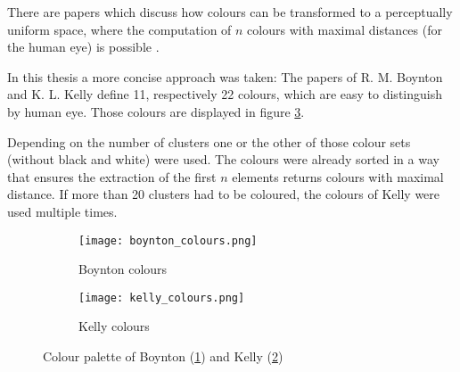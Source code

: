 There are papers which discuss how colours can be transformed to a perceptually uniform space, where the computation of $n$ colours with maximal distances (for the human eye) is possible \cite{colors:2006}.

In this thesis a more concise approach was taken: The papers of R. M. Boynton \cite{boynton:1989} and K. L. Kelly \cite{kelly:1965} define 11, respectively 22 colours, which are easy to distinguish by human eye. Those colours are displayed in figure \ref{fig:colours}.

Depending on the number of clusters one or the other of those colour sets (without black and white) were used. The colours were already sorted in a way that ensures the extraction of the first $n$ elements returns colours with maximal distance. If more than 20 clusters had to be coloured, the colours of Kelly were used multiple times.

\begin{figure}
    \centering
    \begin{subfigure}[b]{\textwidth}
        \begin{mdframed}[style=mdthight]
            \texttt{[image: boynton\_colours.png]}
        \end{mdframed}
        \caption{Boynton colours}
        \label{fig:boynton_colours}
    \end{subfigure}
    \par\medskip
    \begin{subfigure}[b]{\textwidth}
        \begin{mdframed}[style=mdthight]
            \texttt{[image: kelly\_colours.png]}
        \end{mdframed}
        \caption{Kelly colours}
        \label{fig:kelly_colurs}
    \end{subfigure}
    \caption{Colour palette of Boynton (\ref{fig:boynton_colours}) and Kelly (\ref{fig:kelly_colurs})}
    \label{fig:colours}
\end{figure}
